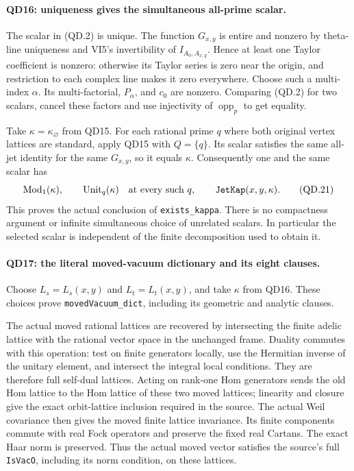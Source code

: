\paragraph{QD16: uniqueness gives the simultaneous all-prime scalar.}
The scalar in (QD.2) is unique.  The function $G_{x,y}$ is entire
and nonzero by theta-line uniqueness and VI5's invertibility of
$I_{A_0,A_{x,y}}$.  Hence at least one Taylor coefficient is
nonzero: otherwise its Taylor series is zero near the origin,
and restriction to each complex line makes it zero everywhere.
Choose such a multi-index $\alpha$.  Its multi-factorial,
$P_\alpha$, and $c_0$ are nonzero.  Comparing (QD.2) for two
scalars, cancel these factors and use injectivity of
$\operatorname{opp}_p$ to get equality.

Take $\kappa=\kappa_{\varnothing}$ from QD15.  For each rational
prime $q$ where both original vertex lattices are standard,
apply QD15 with $Q=\{q\}$.  Its scalar satisfies the same
all-jet identity for the same $G_{x,y}$, so it equals $\kappa$.
Consequently one and the same scalar has
\[
 \mathrm{Mod}_1(\kappa),\qquad
 \mathrm{Unit}_q(\kappa)\quad
  \hbox{at every such }q,\qquad \texttt{JetKap}(x,y,\kappa).
                                                               \tag{QD.21}
\]
This proves the actual conclusion of \texttt{exists\_kappa}.
There is no compactness argument or infinite simultaneous choice
of unrelated scalars.  In particular the selected scalar is
independent of the finite decomposition used to obtain it.

\paragraph{QD17: the literal moved-vacuum dictionary and its eight clauses.}
Choose $L_s=L_s(x,y)$ and $L_t=L_t(x,y)$, and take $\kappa$
from QD16.  These choices prove \texttt{movedVacuum\_dict},
including its geometric and analytic clauses.

The actual moved rational lattices are recovered by intersecting
the finite adelic lattice with the rational vector space in the
unchanged frame.  Duality commutes with this operation: test on
finite generators locally, use the Hermitian inverse of the
unitary element, and intersect the integral local conditions.
They are therefore full self-dual lattices.  Acting on rank-one
Hom generators sends the old Hom lattice to the Hom lattice of
these two moved lattices; linearity and closure give the exact
orbit-lattice inclusion required in the source.  The actual Weil
covariance then gives the moved finite lattice invariance.  Its
finite components commute with real Fock operators and preserve
the fixed real Cartans.  The exact Haar norm is preserved.  Thus
the actual moved vector satisfies the source's full
\texttt{IsVacO}, including its norm condition, on these lattices.

